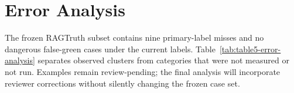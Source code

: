 \section{Error Analysis}
The frozen RAGTruth subset contains nine primary-label misses and no dangerous
false-green cases under the current labels. Table~\ref{tab:table5-error-analysis}
separates observed clusters from categories that were not measured or not run.
Examples remain review-pending; the final analysis will incorporate reviewer
corrections without silently changing the frozen case set.


